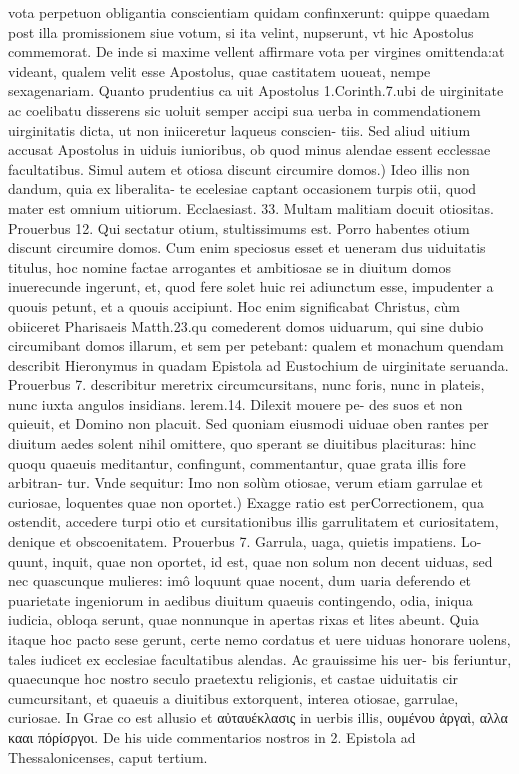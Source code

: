 \documentclass{article}
\begin{document}
\begin{pages}
\marginpar{[ p.110 ]}\pstart vota perpetuon obligantia conscientiam quidam confinxerunt: quippe quaedam post illa promissionem siue votum, si ita velint, nupserunt, vt hic Apostolus commemorat. De inde si maxime vellent affirmare vota per virgines omittenda:at videant, qualem velit esse Apostolus, quae castitatem uoueat, nempe sexagenariam. Quanto prudentius ca uit Apostolus 1.Corinth.7.ubi de uirginitate ac coelibatu disserens sic uoluit semper accipi sua uerba in commendationem uirginitatis dicta, ut non iniiceretur laqueus conscien- tiis. Sed aliud uitium accusat Apostolus in uiduis iunioribus, ob quod minus alendae essent ecclessae facultatibus.  \pend\pstart Simul autem et otiosa discunt circumire domos.) Ideo illis non dandum, quia ex liberalita- te ecelesiae captant occasionem turpis otii, quod mater est omnium uitiorum. Ecclaesiast. 33. Multam malitiam docuit otiositas. Prouerbus 12. Qui sectatur otium, stultissimums est. Porro habentes otium discunt circumire domos. Cum enim speciosus esset et ueneram dus uiduitatis titulus, hoc nomine factae arrogantes et ambitiosae se in diuitum domos inuerecunde ingerunt, et, quod fere solet huic rei adiunctum esse, impudenter a quouis petunt, et a quouis accipiunt. Hoc enim significabat Christus, cùm obiiceret Pharisaeis Matth.23.qu comederent domos uiduarum, qui sine dubio circumibant domos illarum, et sem per petebant: qualem et monachum quendam describit Hieronymus in quadam Epistola ad Eustochium de uirginitate seruanda. Prouerbus 7. describitur meretrix circumcursitans, nunc foris, nunc in plateis, nunc iuxta angulos insidians. lerem.14. Dilexit mouere pe- des suos et non quieuit, et Domino non placuit. Sed quoniam eiusmodi uiduae oben rantes per diuitum aedes solent nihil omittere, quo sperant se diuitibus placituras: hinc quoqu quaeuis meditantur, confingunt, commentantur, quae grata illis fore arbitran- tur. Vnde sequitur:  \pend\pstart Imo non solùm otiosae, verum etiam garrulae et curiosae, loquentes quae non oportet.) Exagge ratio est perCorrectionem, qua ostendit, accedere turpi otio et cursitationibus illis garrulitatem et curiositatem, denique et obscoenitatem. Prouerbus 7. Garrula, uaga, quietis impatiens. Lo- quunt, inquit, quae non oportet, id est, quae non solum non decent uiduas, sed nec quascunque  mulieres: imô loquunt quae nocent, dum uaria deferendo et puarietate ingeniorum in aedibus  diuitum quaeuis contingendo, odia, iniqua iudicia, obloqa serunt, quae nonnunque in apertas rixas et lites abeunt. Quia itaque hoc pacto sese gerunt, certe nemo cordatus et uere uiduas honorare uolens, tales iudicet ex ecclesiae facultatibus alendas. Ac grauissime his uer- bis feriuntur, quaecunque hoc nostro seculo praetextu religionis, et castae uiduitatis cir cumcursitant, et quaeuis a diuitibus extorquent, interea otiosae, garrulae, curiosae. In Grae co est allusio et αὐταυέκλασις in uerbis illis, ουμένου ἀργαὶ, αλλα κααι πόρίσργοι. De his uide commentarios nostros in 2. Epistola ad Thessalonicenses, caput tertium.  \pend
{}
{}

\end{pages}
\end{document}
